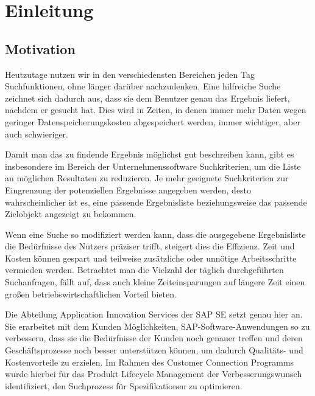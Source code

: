 \chapter{Einleitung}

\section{Motivation}

Heutzutage nutzen wir in den verschiedensten Bereichen jeden Tag Suchfunktionen, ohne länger darüber nachzudenken. Eine hilfreiche Suche zeichnet sich dadurch aus, dass sie dem Benutzer genau das Ergebnis liefert, nachdem er gesucht hat. Dies wird in Zeiten, in denen immer mehr Daten wegen geringer Datenspeicherungskosten abgespeichert werden, immer wichtiger, aber auch schwieriger.

Damit man das zu findende Ergebnis möglichst gut beschreiben kann, gibt es insbesondere im Bereich der Unternehmenssoftware Suchkriterien, um die Liste an möglichen Resultaten zu reduzieren. Je mehr geeignete Suchkriterien zur Eingrenzung der potenziellen Ergebnisse angegeben werden, desto wahrscheinlicher ist es, eine passende Ergebnisliste beziehungsweise das passende Zielobjekt angezeigt zu bekommen.

Wenn eine Suche so modifiziert werden kann, dass die ausgegebene Ergebnisliste die Bedürfnisse des Nutzers präziser trifft, steigert dies die Effizienz. Zeit und Kosten können gespart und teilweise zusätzliche oder unnötige Arbeitsschritte vermieden werden. Betrachtet man die Vielzahl der täglich durchgeführten Suchanfragen, fällt auf, dass auch kleine Zeiteinsparungen auf längere Zeit einen großen betriebswirtschaftlichen Vorteil bieten.

Die Abteilung Application Innovation Services der SAP SE setzt genau hier an. Sie erarbeitet mit dem Kunden Möglichkeiten, SAP-Software-Anwendungen so zu verbessern, dass sie die Bedürfnisse der Kunden noch genauer treffen und deren Geschäftsprozesse noch besser unterstützen können, um dadurch Qualitäts- und Kostenvorteile zu erzielen. Im Rahmen des Customer Connection Programms wurde hierbei für das Produkt Lifecycle Management der Verbesserungswunsch identifiziert, den Suchprozess für Spezifikationen zu optimieren.\autocite[Vgl.][]{ADSESPEC}

